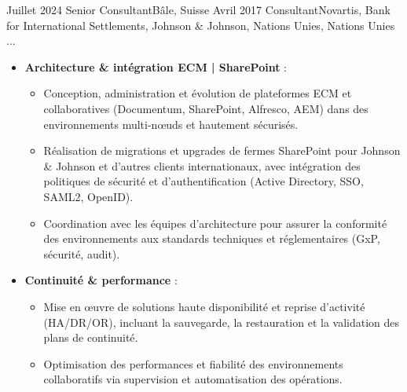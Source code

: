 %
%
%

\begin{experiences}

\consultantexperience
    {Juillet 2024} {Senior Consultant}{}{Bâle, Suisse}
    {Avril 2017}    {Consultant}{Novartis, Bank for International Settlements, Johnson \& Johnson, Nations Unies, Nations Unies ...} {
        \begin{itemize}[left=0pt,label={},itemsep=0.5em]

          \item \textbf{Architecture \& intégration ECM | SharePoint} :
            \begin{itemize}[itemsep=0.2em,topsep=0.2em,parsep=0pt]
              \small
              \item Conception, administration et évolution de plateformes ECM et collaboratives (Documentum, SharePoint, Alfresco, AEM) dans des environnements multi-nœuds et hautement sécurisés.
              \item Réalisation de migrations et upgrades de fermes SharePoint pour Johnson \& Johnson et d’autres clients internationaux, avec intégration des politiques de sécurité et d’authentification (Active Directory, SSO, SAML2, OpenID).
              \item Coordination avec les équipes d’architecture pour assurer la conformité des environnements aux standards techniques et réglementaires (GxP, sécurité, audit).
            \end{itemize}

          \item \textbf{Continuité \& performance} :
            \begin{itemize}[itemsep=0.2em,topsep=0.2em,parsep=0pt]
              \small
              \item Mise en œuvre de solutions haute disponibilité et reprise d’activité (HA/DR/OR), incluant la sauvegarde, la restauration et la validation des plans de continuité.
              \item Optimisation des performances et fiabilité des environnements collaboratifs via supervision et automatisation des opérations.
            \end{itemize}


\end{itemize}}
\end{experiences}
